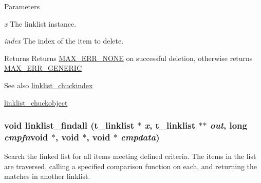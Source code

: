\begin{DoxyParams}{Parameters}
\item[{\em x}]The linklist instance. \item[{\em index}]The index of the item to delete. \end{DoxyParams}
\begin{DoxyReturn}{Returns}
Returns \hyperlink{group__misc_gga0764dd6c02b76cca7d053ae50555d69da6d22f77fef8b1e1b074cef5d29d935fd}{MAX\_\-ERR\_\-NONE} on successful deletion, otherwise returns \hyperlink{group__misc_gga0764dd6c02b76cca7d053ae50555d69dae285bdd436f17560cfd09c6b31ea397d}{MAX\_\-ERR\_\-GENERIC}
\end{DoxyReturn}
\begin{DoxySeeAlso}{See also}
\hyperlink{group__linklist_gaa89cf5b917b41ad0c15963dd79800b50}{linklist\_\-chuckindex} 

\hyperlink{group__linklist_ga6621c47c664c57d794ea2540b62d0956}{linklist\_\-chuckobject} 
\end{DoxySeeAlso}
\hypertarget{group__linklist_ga20253bd1c04d260171435d6b547ac787}{
\subsubsection[{linklist\_\-findall}]{\setlength{\rightskip}{0pt plus 5cm}void linklist\_\-findall ({\bf t\_\-linklist} $\ast$ {\em x}, \/  {\bf t\_\-linklist} $\ast$$\ast$ {\em out}, \/  long  {\em cmpfn}void $\ast$, void $\ast$, \/  void $\ast$ {\em cmpdata})}}
\label{group__linklist_ga20253bd1c04d260171435d6b547ac787}


Search the linked list for all items meeting defined criteria. The items in the list are traversed, calling a specified comparison function on each, and returning the matches in another linklist.


